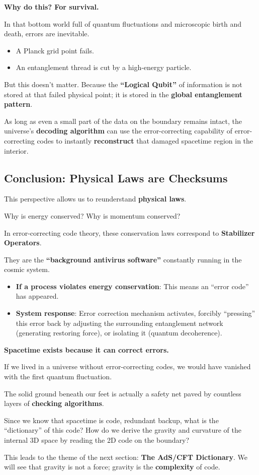 \textbf{Why do this? For survival.}

In that bottom world full of quantum fluctuations and microscopic birth and death, errors are inevitable.

\begin{itemize}
\item A Planck grid point fails.

\item An entanglement thread is cut by a high-energy particle.
\end{itemize}

But this doesn't matter. Because the \textbf{``Logical Qubit''} of information is not stored at that failed physical point; it is stored in the \textbf{global entanglement pattern}.

As long as even a small part of the data on the boundary remains intact, the universe's \textbf{decoding algorithm} can use the error-correcting capability of error-correcting codes to instantly \textbf{reconstruct} that damaged spacetime region in the interior.

\subsection{Conclusion: Physical Laws are Checksums}

This perspective allows us to reunderstand \textbf{physical laws}.

Why is energy conserved? Why is momentum conserved?

In error-correcting code theory, these conservation laws correspond to \textbf{Stabilizer Operators}.

They are the \textbf{``background antivirus software''} constantly running in the cosmic system.

\begin{itemize}
\item \textbf{If a process violates energy conservation}: This means an ``error code'' has appeared.

\item \textbf{System response}: Error correction mechanism activates, forcibly ``pressing'' this error back by adjusting the surrounding entanglement network (generating restoring force), or isolating it (quantum decoherence).
\end{itemize}

\textbf{Spacetime exists because it can correct errors.}

If we lived in a universe without error-correcting codes, we would have vanished with the first quantum fluctuation.

The solid ground beneath our feet is actually a safety net paved by countless layers of \textbf{checking algorithms}.

Since we know that spacetime is code, redundant backup, what is the ``dictionary'' of this code? How do we derive the gravity and curvature of the internal 3D space by reading the 2D code on the boundary?

This leads to the theme of the next section: \textbf{The AdS/CFT Dictionary}. We will see that gravity is not a force; gravity is the \textbf{complexity} of code.

